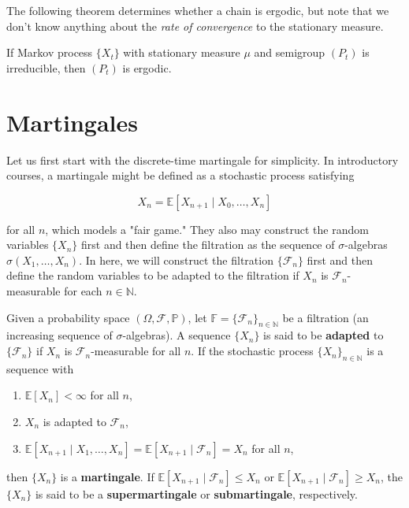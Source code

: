 \documentclass{article}
\begin{document}
    The following theorem determines whether a chain is ergodic, but note that we don't know anything about the \textit{rate of convergence} to the stationary measure. 

    \begin{theorem}
      If Markov process $\{X_t\}$ with stationary measure $\mu$ and semigroup $(P_t)$ is irreducible, then $(P_t)$ is ergodic. 
    \end{theorem}

\section{Martingales}

  Let us first start with the discrete-time martingale for simplicity. In introductory courses, a martingale might be defined as a stochastic process satisfying 

    \[X_n = \mathbb{E}[X_{n+1} \mid X_0, \ldots, X_n]\]

  for all $n$, which models a "fair game." They also may construct the random variables $\{X_n\}$ first and then define the filtration as the sequence of $\sigma$-algebras $\sigma(X_1, \ldots, X_n)$. In here, we will construct the filtration $\{\mathcal{F}_n\}$ first and then define the random variables to be adapted to the filtration if $X_n$ is $\mathcal{F}_n$-measurable for each $n \in \mathbb{N}$. 

  \begin{definition}
    Given a probability space $(\Omega, \mathcal{F}, \mathbb{P})$, let $\mathbb{F} = \{\mathcal{F}_n\}_{n \in \mathbb{N}}$ be a filtration (an increasing sequence of $\sigma$-algebras). A sequence $\{X_n\}$ is said to be \textbf{adapted} to $\{\mathcal{F}_n\}$ if $X_n$ is $\mathcal{F}_n$-measurable for all $n$. If the stochastic process $\{X_n\}_{n \in \mathbb{N}}$ is a sequence with 

    \begin{enumerate}
      \item $\mathbb{E}[X_n] < \infty$ for all $n$, 
      \item $X_n$ is adapted to $\mathcal{F}_n$, 
      \item $\mathbb{E}[X_{n+1} \mid X_1, \ldots, X_n] = \mathbb{E}[X_{n+1} \mid \mathcal{F}_n] = X_n$ for all $n$, 
    \end{enumerate}

    then $\{X_n\}$ is a \textbf{martingale}. If $\mathbb{E}[X_{n+1} \mid \mathcal{F}_n] \leq X_n$ or $\mathbb{E}[X_{n+1} \mid \mathcal{F}_n] \geq X_n$, the $\{X_n\}$ is said to be a \textbf{supermartingale} or \textbf{submartingale}, respectively. 
  \end{definition}
\end{document}
